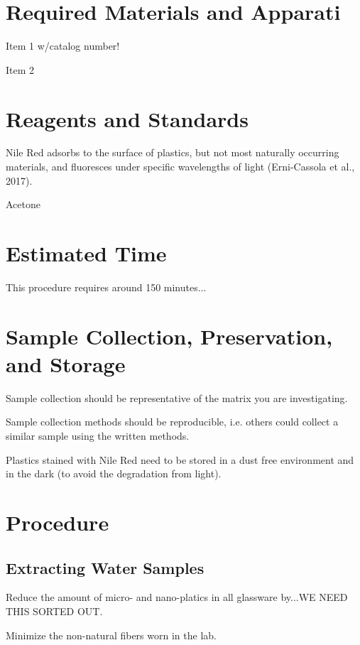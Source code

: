 \documentclass[12pt]{../SOP4_alpha}\usepackage[]{graphicx}\usepackage[]{color}
\begin{document}
\section{Required Materials and Apparati}

\NP Item 1 w/catalog number!

\NP Item 2

\section{Reagents and Standards}

\NP Nile Red adsorbs to the surface of plastics, but not most naturally occurring materials, and fluoresces under specific wavelengths of light (Erni-Cassola et al., 2017). 

\NP Acetone

\section{Estimated Time}

\NP This procedure requires around 150 minutes...

\section{Sample Collection, Preservation, and Storage}

\NP Sample collection should be representative of the matrix you are investigating. 

\NP Sample collection methods should be reproducible, i.e. others could collect a similar sample using the written methods. 

\NP Plastics stained with Nile Red need to be stored in a dust free environment and in the dark (to avoid the degradation from light).

\section{Procedure}

\subsection{Extracting Water Samples}

\NP Reduce the amount of micro- and nano-platics in all glassware by...WE NEED THIS SORTED OUT. 

\NP Minimize the non-natural fibers worn in the lab. 
\end{document}
